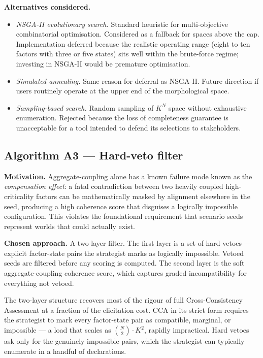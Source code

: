 \documentclass[11pt,a4paper]{article}
\begin{document}
\textbf{Alternatives considered.}

\begin{itemize}[leftmargin=*]
  \item \emph{NSGA-II evolutionary search.} Standard heuristic for multi-objective combinatorial optimisation. Considered as a fallback for spaces above the cap. Implementation deferred because the realistic operating range (eight to ten factors with three or five states) sits well within the brute-force regime; investing in NSGA-II would be premature optimisation.
  \item \emph{Simulated annealing.} Same reason for deferral as NSGA-II. Future direction if users routinely operate at the upper end of the morphological space.
  \item \emph{Sampling-based search.} Random sampling of $K^N$ space without exhaustive enumeration. Rejected because the loss of completeness guarantee is unacceptable for a tool intended to defend its selections to stakeholders.
\end{itemize}

\subsection{Algorithm A3 — Hard-veto filter}

\textbf{Motivation.} Aggregate-coupling alone has a known failure mode known as the \emph{compensation effect}: a fatal contradiction between two heavily coupled high-criticality factors can be mathematically masked by alignment elsewhere in the seed, producing a high coherence score that disguises a logically impossible configuration. This violates the foundational requirement that scenario seeds represent worlds that could actually exist.

\textbf{Chosen approach.} A two-layer filter. The first layer is a set of hard vetoes — explicit factor-state pairs the strategist marks as logically impossible. Vetoed seeds are filtered before any scoring is computed. The second layer is the soft aggregate-coupling coherence score, which captures graded incompatibility for everything not vetoed.

The two-layer structure recovers most of the rigour of full Cross-Consistency Assessment at a fraction of the elicitation cost. CCA in its strict form requires the strategist to mark every factor-state pair as compatible, marginal, or impossible — a load that scales as $\binom{N}{2} \cdot K^2$, rapidly impractical. Hard vetoes ask only for the genuinely impossible pairs, which the strategist can typically enumerate in a handful of declarations.
\end{document}
